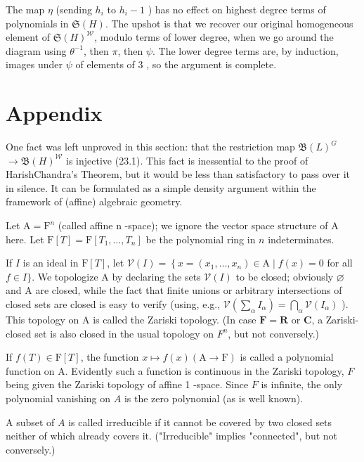 \documentclass[10pt]{article}
\begin{document}
The map $\eta$ (sending $h_{i}$ to $h_{i}-1$ ) has no effect on highest degree terms of polynomials in $\mathfrak{S}(H)$. The upshot is that we recover our original homogeneous element of $\mathfrak{S}(H)^{\mathscr{W}}$, modulo terms of lower degree, when we go around the diagram using $\theta^{-1}$, then $\pi$, then $\psi$. The lower degree terms are, by induction, images under $\psi$ of elements of 3 , so the argument is complete.

\section*{Appendix}
One fact was left unproved in this section: that the restriction map $\mathfrak{B}(L)^{G}$ $\rightarrow \mathfrak{B}(H)^{\mathscr{W}}$ is injective (23.1). This fact is inessential to the proof of HarishChandra's Theorem, but it would be less than satisfactory to pass over it in silence. It can be formulated as a simple density argument within the framework of (affine) algebraic geometry.

Let $\mathrm{A}=\mathrm{F}^{n}$ (called affine n -space); we ignore the vector space structure of A here. Let $\mathrm{F}[T]=\mathrm{F}\left[T_{1}, \ldots, T_{n}\right]$ be the polynomial ring in $n$ indeterminates.

If $I$ is an ideal in $\mathrm{F}[T]$, let $\mathscr{V}(I)=\left\{x=\left(x_{1}, \ldots, x_{n}\right) \in \mathrm{A} \mid f(x)=0\right.$ for all $f \in I\}$. We topologize A by declaring the sets $\mathscr{V}(I)$ to be closed; obviously $\varnothing$ and A are closed, while the fact that finite unions or arbitrary intersections of closed sets are closed is easy to verify (using, e.g., $\mathscr{V}\left(\sum_{\alpha} I_{\alpha}\right)=\bigcap_{\alpha} \mathscr{V}\left(I_{\alpha}\right)$ ). This topology on A is called the Zariski topology. (In case $\mathbf{F}=\mathbf{R}$ or $\mathbf{C}$, a Zariski-closed set is also closed in the usual topology on $F^{n}$, but not conversely.)

If $f(T) \in \mathrm{F}[T]$, the function $x \mapsto f(x)(\mathrm{A} \rightarrow \mathrm{F})$ is called a polynomial function on A. Evidently such a function is continuous in the Zariski topology, $F$ being given the Zariski topology of affine 1 -space. Since $F$ is infinite, the only polynomial vanishing on $A$ is the zero polynomial (as is well known).

A subset of $A$ is called irreducible if it cannot be covered by two closed sets neither of which already covers it. ("Irreducible" implies "connected", but not conversely.)
\end{document}
